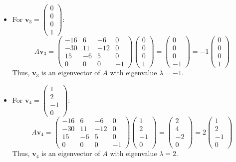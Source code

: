 \documentclass{article}
\begin{document}
\begin{itemize}
    \item For \( \mathbf{v}_3 = \begin{pmatrix} 0 \\ 0 \\ 0 \\ 1 \end{pmatrix} \):
          \[
              A \mathbf{v}_3 = \begin{pmatrix} -16 & 6 & -6 & 0 \\ -30 & 11 & -12 & 0 \\ 15 & -6 & 5 & 0 \\ 0 & 0 & 0 & -1 \end{pmatrix} \begin{pmatrix} 0 \\ 0 \\ 0 \\ 1 \end{pmatrix} = \begin{pmatrix} 0 \\ 0 \\ 0 \\ -1 \end{pmatrix} = -1 \begin{pmatrix} 0 \\ 0 \\ 0 \\ 1 \end{pmatrix}
          \]
          Thus, \( \mathbf{v}_3 \) is an eigenvector of \( A \) with eigenvalue \( \lambda = -1 \).

    \item For \( \mathbf{v}_4 = \begin{pmatrix} 1 \\ 2 \\ -1 \\ 0 \end{pmatrix} \):
          \[
              A \mathbf{v}_4 = \begin{pmatrix} -16 & 6 & -6 & 0 \\ -30 & 11 & -12 & 0 \\ 15 & -6 & 5 & 0 \\ 0 & 0 & 0 & -1 \end{pmatrix} \begin{pmatrix} 1 \\ 2 \\ -1 \\ 0 \end{pmatrix} = \begin{pmatrix} 2 \\ 4 \\ -2 \\ 0 \end{pmatrix} = 2 \begin{pmatrix} 1 \\ 2 \\ -1 \\ 0 \end{pmatrix}
          \]
          Thus, \( \mathbf{v}_4 \) is an eigenvector of \( A \) with eigenvalue \( \lambda = 2 \).
\end{itemize}
\end{document}
